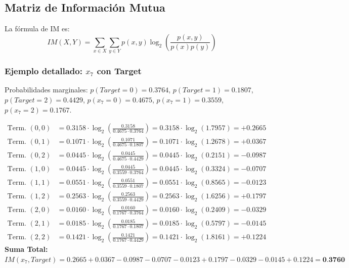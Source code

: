 \documentclass[12pt,a4paper]{article}
\begin{document}
\subsection{Matriz de Información Mutua}

La fórmula de IM es:
\begin{equation}
    IM(X,Y) = \sum_{x \in X}\sum_{y \in Y} p(x,y) \log_2 \left(\frac{p(x,y)}{p(x)p(y)}\right)
\end{equation}

\subsubsection{Ejemplo detallado: $x_7$ con Target}

Probabilidades marginales: $p(Target=0)=0.3764$, $p(Target=1)=0.1807$, $p(Target=2)=0.4429$, $p(x_7=0)=0.4675$, $p(x_7=1)=0.3559$, $p(x_7=2)=0.1767$.

\begin{align*}
    \text{Term. } (0,0) &= 0.3158 \cdot \log_2\left(\frac{0.3158}{0.4675 \cdot 0.3764}\right) = 0.3158 \cdot \log_2(1.7957) = \mathbf{+0.2665} \\
    \text{Term. } (0,1) &= 0.1071 \cdot \log_2\left(\frac{0.1071}{0.4675 \cdot 0.1807}\right) = 0.1071 \cdot \log_2(1.2678) = \mathbf{+0.0367} \\
    \text{Term. } (0,2) &= 0.0445 \cdot \log_2\left(\frac{0.0445}{0.4675 \cdot 0.4429}\right) = 0.0445 \cdot \log_2(0.2151) = \mathbf{-0.0987} \\
    \text{Term. } (1,0) &= 0.0445 \cdot \log_2\left(\frac{0.0445}{0.3559 \cdot 0.3764}\right) = 0.0445 \cdot \log_2(0.3324) = \mathbf{-0.0707} \\
    \text{Term. } (1,1) &= 0.0551 \cdot \log_2\left(\frac{0.0551}{0.3559 \cdot 0.1807}\right) = 0.0551 \cdot \log_2(0.8565) = \mathbf{-0.0123} \\
    \text{Term. } (1,2) &= 0.2563 \cdot \log_2\left(\frac{0.2563}{0.3559 \cdot 0.4429}\right) = 0.2563 \cdot \log_2(1.6256) = \mathbf{+0.1797} \\
    \text{Term. } (2,0) &= 0.0160 \cdot \log_2\left(\frac{0.0160}{0.1767 \cdot 0.3764}\right) = 0.0160 \cdot \log_2(0.2409) = \mathbf{-0.0329} \\
    \text{Term. } (2,1) &= 0.0185 \cdot \log_2\left(\frac{0.0185}{0.1767 \cdot 0.1807}\right) = 0.0185 \cdot \log_2(0.5797) = \mathbf{-0.0145} \\
    \text{Term. } (2,2) &= 0.1421 \cdot \log_2\left(\frac{0.1421}{0.1767 \cdot 0.4429}\right) = 0.1421 \cdot \log_2(1.8161) = \mathbf{+0.1224}
\end{align*}
\textbf{Suma Total:} $IM(x_7, Target) = 0.2665 + 0.0367 - 0.0987 - 0.0707 - 0.0123 + 0.1797 - 0.0329 - 0.0145 + 0.1224 = \textbf{0.3760}$
\end{document}
